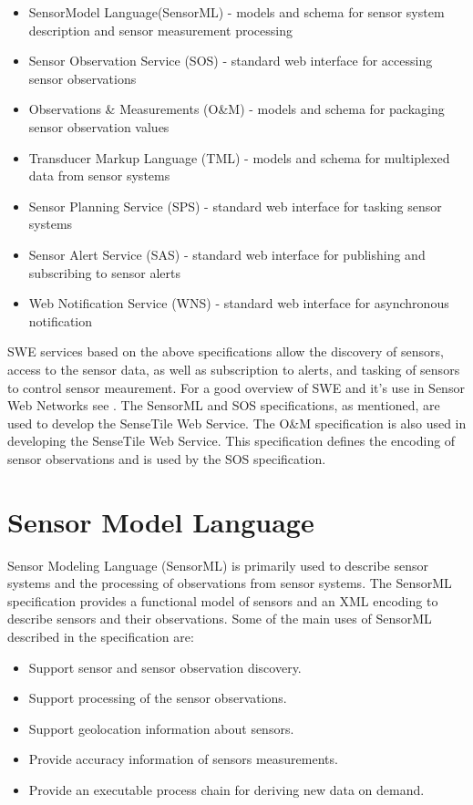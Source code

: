 \documentclass[]{final_report}
\begin{document}
\begin{itemize}
\item  SensorModel Language(SensorML) - models and schema for sensor system description and sensor measurement processing
\item  Sensor Observation Service (SOS) - standard web interface for accessing sensor observations
\item  Observations \& Measurements (O\&M) - models and schema for packaging sensor observation values
\item  Transducer Markup Language (TML) - models and schema for multiplexed data from sensor systems
\item  Sensor Planning Service (SPS) - standard web interface for tasking sensor systems
\item  Sensor Alert Service (SAS) - standard web interface for publishing and subscribing to sensor alerts
\item  Web Notification Service (WNS) - standard web interface for asynchronous notification
\end{itemize}

SWE services based on the above specifications allow the discovery of sensors, access to the sensor data, as well as subscription to alerts, and tasking of sensors to control sensor meaurement. For a good overview of SWE and it's use in Sensor Web Networks see \cite{SWEArchref}.  The SensorML and SOS specifications, as mentioned, are used to develop the SenseTile Web Service. The O\&M specification is also used in developing the SenseTile Web Service. This specification defines the encoding of sensor observations and is used by the SOS specification. 


\section{Sensor Model Language}\label{SMLsection}
Sensor Modeling Language (SensorML) is primarily used to describe sensor systems and the processing of observations from sensor systems. The SensorML specification\cite{SMLref} provides a functional model of sensors and an XML encoding to describe sensors and their observations. Some of the main uses of SensorML described in the specification are:
\begin{itemize}
\item Support sensor and sensor observation discovery.
\item Support processing of the sensor observations.
\item Support geolocation information about sensors.
\item Provide accuracy information of sensors measurements.
\item Provide an executable process chain for deriving new data on demand.
\end{itemize}
\end{document}

